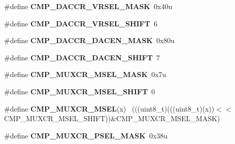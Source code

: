 \begin{DoxyCompactItemize}
\item 
\hypertarget{group___c_m_p___register___masks_gac9eceaf5b3e478eb1a332681c8bcf160}{}\#define {\bfseries C\+M\+P\+\_\+\+D\+A\+C\+C\+R\+\_\+\+V\+R\+S\+E\+L\+\_\+\+M\+A\+S\+K}~0x40u\label{group___c_m_p___register___masks_gac9eceaf5b3e478eb1a332681c8bcf160}

\item 
\hypertarget{group___c_m_p___register___masks_gab9f804a9c4ecafbaaa82f2fc0ec69083}{}\#define {\bfseries C\+M\+P\+\_\+\+D\+A\+C\+C\+R\+\_\+\+V\+R\+S\+E\+L\+\_\+\+S\+H\+I\+F\+T}~6\label{group___c_m_p___register___masks_gab9f804a9c4ecafbaaa82f2fc0ec69083}

\item 
\hypertarget{group___c_m_p___register___masks_gacfd8aec2de81865d8f5fc0f06d17ba08}{}\#define {\bfseries C\+M\+P\+\_\+\+D\+A\+C\+C\+R\+\_\+\+D\+A\+C\+E\+N\+\_\+\+M\+A\+S\+K}~0x80u\label{group___c_m_p___register___masks_gacfd8aec2de81865d8f5fc0f06d17ba08}

\item 
\hypertarget{group___c_m_p___register___masks_ga85aa1686a0d5a7de2375bfab7167bb93}{}\#define {\bfseries C\+M\+P\+\_\+\+D\+A\+C\+C\+R\+\_\+\+D\+A\+C\+E\+N\+\_\+\+S\+H\+I\+F\+T}~7\label{group___c_m_p___register___masks_ga85aa1686a0d5a7de2375bfab7167bb93}

\item 
\hypertarget{group___c_m_p___register___masks_ga6ff83366097d3be5ae93234b68684cf5}{}\#define {\bfseries C\+M\+P\+\_\+\+M\+U\+X\+C\+R\+\_\+\+M\+S\+E\+L\+\_\+\+M\+A\+S\+K}~0x7u\label{group___c_m_p___register___masks_ga6ff83366097d3be5ae93234b68684cf5}

\item 
\hypertarget{group___c_m_p___register___masks_gad74d8206afe9b7ad009b0a7ac2bbf1cf}{}\#define {\bfseries C\+M\+P\+\_\+\+M\+U\+X\+C\+R\+\_\+\+M\+S\+E\+L\+\_\+\+S\+H\+I\+F\+T}~0\label{group___c_m_p___register___masks_gad74d8206afe9b7ad009b0a7ac2bbf1cf}

\item 
\hypertarget{group___c_m_p___register___masks_ga61a47f441cc9f0145482ce3f1561160a}{}\#define {\bfseries C\+M\+P\+\_\+\+M\+U\+X\+C\+R\+\_\+\+M\+S\+E\+L}(x)                                            ~(((uint8\+\_\+t)(((uint8\+\_\+t)(x))$<$$<$C\+M\+P\+\_\+\+M\+U\+X\+C\+R\+\_\+\+M\+S\+E\+L\+\_\+\+S\+H\+I\+F\+T))\&C\+M\+P\+\_\+\+M\+U\+X\+C\+R\+\_\+\+M\+S\+E\+L\+\_\+\+M\+A\+S\+K)\label{group___c_m_p___register___masks_ga61a47f441cc9f0145482ce3f1561160a}

\item 
\hypertarget{group___c_m_p___register___masks_gaba9739da107b2a2b908af338d14df160}{}\#define {\bfseries C\+M\+P\+\_\+\+M\+U\+X\+C\+R\+\_\+\+P\+S\+E\+L\+\_\+\+M\+A\+S\+K}~0x38u\label{group___c_m_p___register___masks_gaba9739da107b2a2b908af338d14df160}


\end{DoxyCompactItemize}

